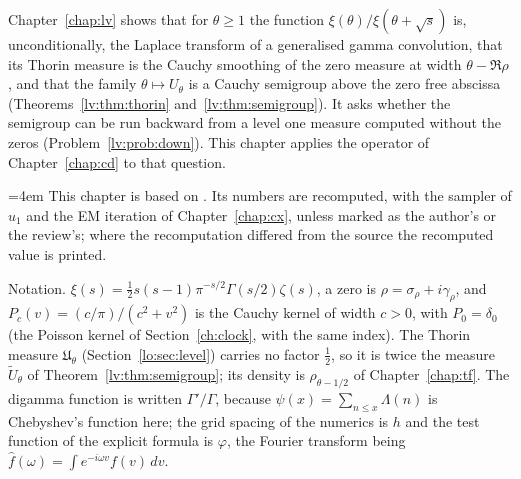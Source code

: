 \label{chap:lo}

Chapter~\ref{chap:lv} shows that for $\theta\ge1$ the function $\xi(\theta)/\xi(\theta+\sqrt s)$ is, unconditionally, the Laplace transform of a generalised gamma convolution, that its Thorin measure is the Cauchy smoothing of the zero measure at width $\theta-\Re\rho$, and that the family $\theta\mapsto U_\theta$ is a Cauchy semigroup above the zero free abscissa (Theorems~\ref{lv:thm:thorin} and~\ref{lv:thm:semigroup}). It asks whether the semigroup can be run backward from a level one measure computed without the zeros (Problem~\ref{lv:prob:down}). This chapter applies the operator of Chapter~\ref{chap:cd} to that question.

{\emergencystretch=4em This chapter is based on \cite{P26lo}. Its numbers are recomputed, with the sampler of $u_1$ and the EM iteration of Chapter~\ref{chap:cx}, unless marked as the author's or the review's; where the recomputation differed from the source the recomputed value is printed.\par}

Notation. $\xi(s)=\tfrac12s(s-1)\pi^{-s/2}\Gamma(s/2)\zeta(s)$, a zero is $\rho=\sigma_\rho+i\gamma_\rho$, and $P_c(v)=(c/\pi)/(c^2+v^2)$ is the Cauchy kernel of width $c>0$, with $P_0=\delta_0$ (the Poisson kernel of Section~\ref{ch:clock}, with the same index). The Thorin measure $\mathfrak U_\theta$ (Section~\ref{lo:sec:level}) carries no factor $\tfrac12$, so it is twice the measure $\widetilde U_\theta$ of Theorem~\ref{lv:thm:semigroup}; its density is $\rho_{\theta-1/2}$ of Chapter~\ref{chap:tf}. The digamma function is written $\Gamma'/\Gamma$, because $\psi(x)=\sum_{n\le x}\Lambda(n)$ is Chebyshev's function here; the grid spacing of the numerics is $h$ and the test function of the explicit formula is $\varphi$, the Fourier transform being $\widehat f(\omega)=\int e^{-i\omega v}f(v)\,dv$.

